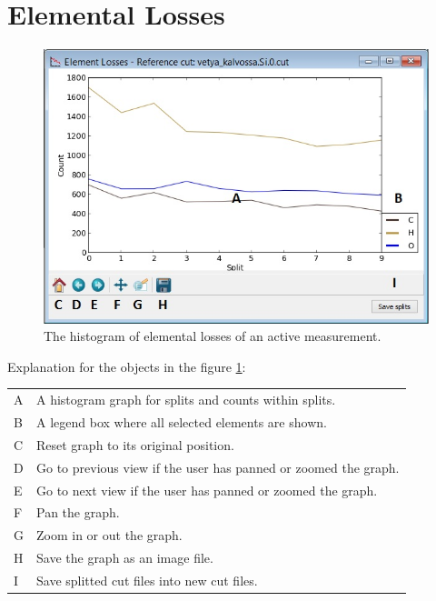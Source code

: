 \documentclass{scrreprt}
\begin{document}
\section{Elemental Losses}\label{measurementtab-elemloss}
\begin{figure}[H]
\centering
\includegraphics[width=140mm]{measurement-elemloss}
\caption{The histogram of elemental losses of an active measurement.}
\label{fig-elemloss}
\end{figure}
Explanation for the objects in the figure \ref{fig-elemloss}:

\begin{tabular}{ll}
A & A histogram graph for splits and counts within splits.\\
B & A legend box where all selected elements are shown.\\
C & Reset graph to its original position.\\
D & Go to previous view if the user has panned or zoomed the graph.\\
E & Go to next view if the user has panned or zoomed the graph.\\
F & Pan the graph.\\
G & Zoom in or out the graph.\\
H & Save the graph as an image file.\\
I & Save splitted cut files into new cut files.\\
\end{tabular}

\end{document}
